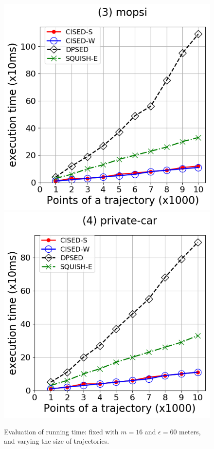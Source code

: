 {\begin{figure}[tb!]
\includegraphics[scale = 0.275]{Figures/Exp-time-size-mopsi.png}\hspace{3ex}
\includegraphics[scale = 0.275]{Figures/Exp-time-size-private.png}
\caption{\small Evaluation of running time: fixed with $m=16$ and $\epsilon=60$ meters, and varying the size of trajectories. }
\label{fig:time-size}
\vspace{-2ex}
\end{figure}







}
